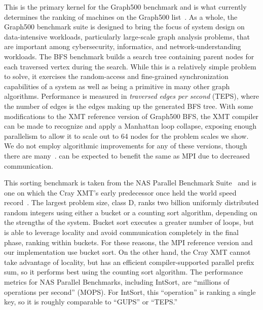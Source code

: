 \vspace{0.5ex}
 This is the primary kernel for the
Graph500 benchmark and is what currently determines the ranking of machines on
the Graph500 list~\cite{graph500list}. As a whole, the Graph500 benchmark
suite is designed to bring the focus of system design on data-intensive
workloads, particularly large-scale graph analysis problems, that are
important among cybersecurity, informatics, and network-understanding
workloads. The BFS benchmark builds a search tree containing parent nodes for
each traversed vertex during the search. While this is a relatively simple
problem to solve, it exercises the random-access and fine-grained
synchronization capabilities of a system as well as being a primitive in many
other graph algorithms. Performance is measured in \emph{traversed edges per
second\/} (TEPS), where the number of edges is the edges making up the
generated BFS tree. With some modifications to the XMT reference version of Graph500 BFS,
the XMT compiler can be made to recognize and apply a Manhattan loop collapse, exposing enough parallelism to allow it to scale out to 64 nodes for the problem scales we show.
We do not employ algorithmic improvements for any of these versions, though there are
many~\cite{Beamer:Graph500,Yoo:FixedPointGraph500}. \Grappa can be expected to benefit the same as MPI due to decreased communication.

\vspace{0.5ex}
 This sorting benchmark is taken from the NAS Parallel Benchmark Suite~\cite{Bailey91thenas,nas3.3} and is one on which the Cray XMT's early predecessor once held the world speed record~\cite{TeraRecord}. The largest problem size, class D, ranks two billion uniformly distributed random integers using either a bucket or a counting sort algorithm, depending on the strengths of the system. Bucket sort executes a greater number of loops, but is able to leverage locality and avoid communication completely in the final phase, ranking within buckets. For these reasons, the MPI reference version and our \Grappa implementation use bucket sort. On the other hand, the Cray XMT cannot take advantage of locality, but has an efficient compiler-supported parallel prefix sum, so it performs best using the counting sort algorithm.  The performance metrics for NAS Parallel Benchmarks, including IntSort, are ``millions of operations per second'' (MOPS). For IntSort, this ``operation'' is ranking a single key, so it is roughly comparable to ``GUPS'' or ``TEPS.''
 
